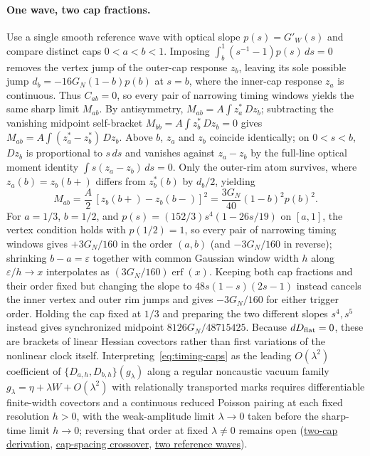 \documentclass[10pt,a4paper]{article}
\numberwithin{equation}{section}
\newcommand{\repo}[2]{\href{https://github.com/sprajs/quantum-gravity/blob/main/#1}{#2}}
\begin{document}
\paragraph{One wave, two cap fractions.}
Use a single smooth reference wave with optical slope $p(s)=G'_W(s)$ and compare distinct caps $0<a<b<1$. Imposing $\int_b^1(s^{-1}-1)p(s)\,ds=0$ removes the vertex jump of the outer-cap response $z_b$, leaving its sole possible jump $d_b=-16G_N(1-b)p(b)$ at $s=b$, where the inner-cap response $z_a$ is continuous. Thus $C_{ab}=0$, so every pair of narrowing timing windows yields the same sharp limit $M_{ab}$. By antisymmetry, $M_{ab}=A\int z_a^*\,Dz_b$; subtracting the vanishing midpoint self-bracket $M_{bb}=A\int z_b^*\,Dz_b=0$ gives $M_{ab}=A\int(z_a^*-z_b^*)\,Dz_b$. Above $b$, $z_a$ and $z_b$ coincide identically; on $0<s<b$, $Dz_b$ is proportional to $s\,ds$ and vanishes against $z_a-z_b$ by the full-line optical moment identity $\int s(z_a-z_b)\,ds=0$. Only the outer-rim atom survives, where $z_a(b)=z_b(b+)$ differs from $z_b^*(b)$ by $d_b/2$, yielding
\begin{equation}
 M_{ab}=\frac{A}{2}\,[z_b(b+)-z_b(b-)]^2
       =\frac{3G_N}{40}(1-b)^2p(b)^2 .
 \label{eq:timing-caps}
\end{equation}
For $a=1/3$, $b=1/2$, and $p(s)=(152/3)s^4(1-26s/19)$ on $[a,1]$, the vertex condition holds with $p(1/2)=1$, so every pair of narrowing timing windows gives $+3G_N/160$ in the order $(a,b)$ (and $-3G_N/160$ in reverse); shrinking $b-a=\varepsilon$ together with common Gaussian window width $h$ along $\varepsilon/h\to x$ interpolates as $(3G_N/160)\operatorname{erf}(x)$. Keeping both cap fractions and their order fixed but changing the slope to $48s(1-s)(2s-1)$ instead cancels the inner vertex and outer rim jumps and gives $-3G_N/160$ for either trigger order. Holding the cap fixed at $1/3$ and preparing the two different slopes $s^4,s^5$ instead gives synchronized midpoint $8126G_N/48715425$. Because $dD_{\rm flat}=0$, these are brackets of linear Hessian covectors rather than first variations of the nonlinear clock itself. Interpreting~\eqref{eq:timing-caps} as the leading $O(\lambda^2)$ coefficient of $\{D_{a,h},D_{b,h}\}(g_\lambda)$ along a regular noncaustic vacuum family $g_\lambda=\eta+\lambda W+O(\lambda^2)$ with relationally transported marks requires differentiable finite-width covectors and a continuous reduced Poisson pairing at each fixed resolution $h>0$, with the weak-amplitude limit $\lambda\to0$ taken before the sharp-time limit $h\to0$; reversing that order at fixed $\lambda\neq0$ remains open (\repo{audit/timing-caps.md}{two-cap derivation}, \repo{audit/timing-cap-spacing.md}{cap-spacing crossover}, \repo{audit/timing-two-clocks.md}{two reference waves}).
\end{document}

